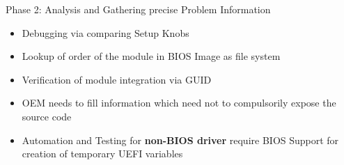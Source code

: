 \begin{frame}{Phase 2: Analysis and Gathering precise Problem Information}
	\begin{itemize}
		\item Debugging via comparing Setup Knobs
		\item Lookup of order of the module in BIOS Image as file system
		\item Verification of module integration via GUID
		\item OEM needs to fill information which need not to compulsorily expose the source code
		\item Automation and Testing for \textbf{non-BIOS driver} require BIOS Support for creation of temporary UEFI variables 
	\end{itemize}
\end{frame}